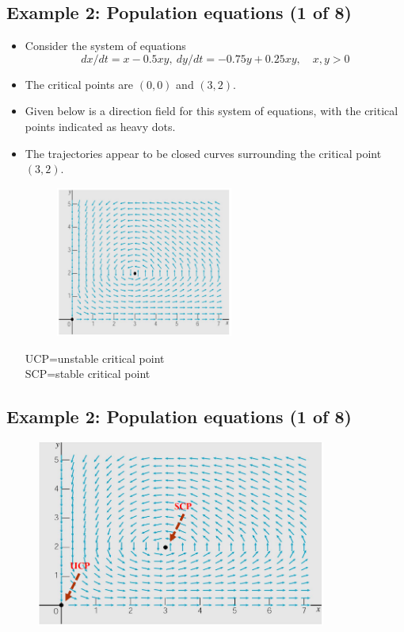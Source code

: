 \documentclass[11pt,a4paper]{article}
\begin{document}
	\subsection*{Example 2: Population equations (1 of 8)}
	\begin{itemize}
		\item Consider the system of equations
		$$
		dx/dt = x-0.5xy,\ dy/dt = -0.75y + 0.25xy,\quad x,y>0
		$$
		\item The critical points are $(0,0)$ and $(3,2)$.
		\item Given below is a direction field for this system of equations, with the critical points indicated as heavy dots.
		\item The trajectories appear to be closed curves surrounding the critical point $(3,2)$.
		\begin{figure}[H]
			\centering
			\includegraphics[width=0.55\textwidth]{figure/Lec17f4.PNG}
		\end{figure}
		UCP=unstable critical point\\
		SCP=stable critical point
	\end{itemize}
	\subsection*{Example 2: Population equations (1 of 8)}
	\begin{figure}[H]
		\centering
		\includegraphics[width=0.85\textwidth]{figure/Lec17f5.PNG}
	\end{figure}
\end{document}
